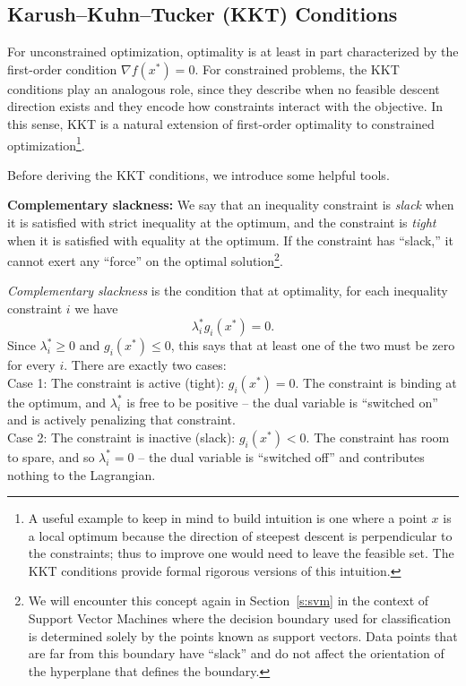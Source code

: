\subsection{Karush–Kuhn–Tucker (KKT) Conditions}
\label{ss:KKT}

For unconstrained optimization, optimality is at least in part characterized by the first-order condition $\nabla f(x^*) = 0$.
For constrained problems, the KKT conditions play an analogous role, since they describe when no feasible descent direction exists and they encode how constraints interact with the objective. In this sense, KKT is a natural extension of first-order optimality to constrained optimization\footnote{A useful example to keep in mind to build intuition is one where a point $x$ is a local optimum because the direction of steepest descent is perpendicular to the constraints; thus to improve one would need to leave the feasible set. The KKT conditions provide formal rigorous versions of this intuition.}.

Before deriving the KKT conditions, we  introduce some helpful tools.

\smallskip
\noindent
\textbf{Complementary slackness:}
We say that an inequality constraint is {\em slack} when it is satisfied with strict inequality at the optimum, and the constraint is {\em tight}  when it is satisfied with equality at the optimum. If the constraint has ``slack,'' it cannot exert any ``force'' on the optimal solution\footnote{We will encounter this concept again in Section~\ref{s:svm} in the context of Support Vector Machines where the decision boundary used for classification is determined solely by the points known as support vectors. Data points that are far from this boundary have ``slack'' and do not affect the orientation of the hyperplane that defines the boundary.}.

{\em Complementary slackness} is the condition that at optimality, for each inequality constraint $i$ we have 
$$\lambda_i^* g_i(x^*) = 0.$$
Since $\lambda_i^* \geq 0$ and $g_i(x^*) \leq 0$, this says that at least one of the two must be zero for every $i$. There are exactly two cases: \\
Case 1: The constraint is active (tight): $g_i(x^*) = 0$. The constraint is binding at the optimum, and $\lambda_i^*$ is free to be positive -- the dual variable is ``switched on'' and is actively penalizing that constraint.\\
Case 2: The constraint is inactive (slack): $g_i(x^*) < 0$. The constraint has room to spare, and so $\lambda_i^* = 0$ -- the dual variable is ``switched off'' and contributes nothing to the Lagrangian.


